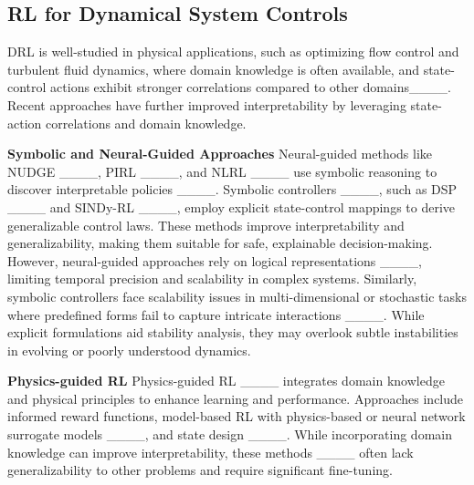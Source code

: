 \subsection{RL for Dynamical System Controls}
DRL is well-studied in physical applications, such as optimizing flow control and turbulent fluid dynamics, where domain knowledge is often available, and state-control actions exhibit stronger correlations compared to other domains____. Recent approaches have further improved interpretability by leveraging state-action correlations and domain knowledge.

\textbf{Symbolic and Neural-Guided Approaches} 
Neural-guided methods like NUDGE ____, PIRL ____, and NLRL ____ use symbolic reasoning to discover interpretable policies ____. Symbolic controllers ____, such as DSP ____ and SINDy-RL ____, employ explicit state-control mappings to derive generalizable control laws.
These methods improve interpretability and generalizability, making them suitable for safe, explainable decision-making. However, neural-guided approaches rely on logical representations ____, limiting temporal precision and scalability in complex systems. Similarly, symbolic controllers face scalability issues in multi-dimensional or stochastic tasks where predefined forms fail to capture intricate interactions ____. While explicit formulations aid stability analysis, they may overlook subtle instabilities in evolving or poorly understood dynamics.

\textbf{Physics-guided RL}
Physics-guided RL ____ integrates domain knowledge and physical principles to enhance learning and performance. Approaches include informed reward functions, model-based RL with physics-based or neural network surrogate models ____, and state design ____. While incorporating domain knowledge can improve interpretability, these methods ____ often lack generalizability to other problems and require significant fine-tuning.


